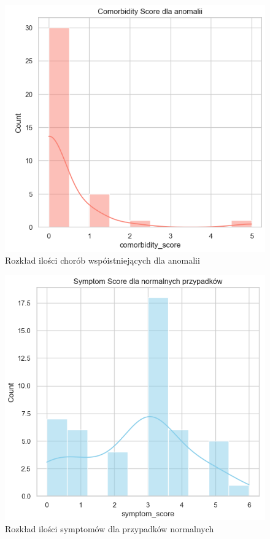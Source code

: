 \documentclass[a4paper,fleqn]{cas-dc}
\begin{document}
\begin{figure}[h]
	\includegraphics[scale=.73]{wykresy/wykres2.2.png}
	\caption{ Rozkład ilości chorób wspóistniejących dla anomalii}
	\label{FIG:1}
\end{figure}

\begin{figure}[h]
	\includegraphics[scale=.73]{wykresy/wykres3.1.png}
	\caption{Rozkład ilości symptomów dla przypadków normalnych}
	\label{FIG:1}
\end{figure}
\end{document}
